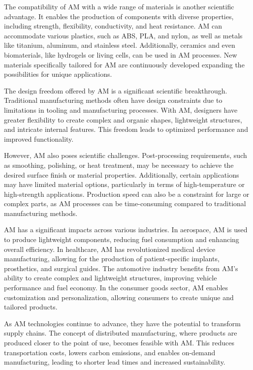 The compatibility of AM with a wide range of materials is another scientific advantage. It enables the production of components with diverse properties, including strength, flexibility, conductivity, and heat resistance. AM can accommodate various plastics, such as ABS, PLA, and nylon, as well as metals like titanium, aluminum, and stainless steel. Additionally, ceramics and even biomaterials, like hydrogels or living cells, can be used in AM processes. New materials specifically tailored for AM are continuously developed  expanding the possibilities for unique applications.

The design freedom offered by AM is a significant scientific breakthrough. Traditional manufacturing methods often have design constraints due to limitations in tooling and manufacturing processes. With AM, designers have greater flexibility to create complex and organic shapes, lightweight structures, and intricate internal features. This freedom leads to optimized performance and improved functionality.

However, AM also poses scientific challenges. Post-processing requirements, such as smoothing, polishing, or heat treatment, may be necessary to achieve the desired surface finish or material properties. Additionally, certain applications may have limited material options, particularly in terms of high-temperature or high-strength applications. Production speed can also be a constraint for large or complex parts, as AM processes can be time-consuming compared to traditional manufacturing methods.

AM has a significant impacts across various industries. In aerospace, AM is used to produce lightweight components, reducing fuel consumption and enhancing overall efficiency. In healthcare, AM has revolutionized medical device manufacturing, allowing for the production of patient-specific implants, prosthetics, and surgical guides. The automotive industry benefits from AM's ability to create complex and lightweight structures, improving vehicle performance and fuel economy. In the consumer goods sector, AM enables customization and personalization, allowing consumers to create unique and tailored products.

As AM technologies continue to advance, they have the potential to transform supply chains. The concept of distributed manufacturing, where products are produced closer to the point of use, becomes feasible with AM. This reduces transportation costs, lowers carbon emissions, and enables on-demand manufacturing, leading to shorter lead times and increased sustainability.

